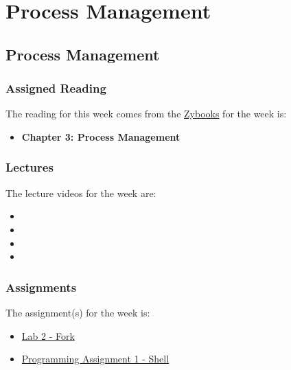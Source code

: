 \clearpage

\renewcommand{\ChapTitle}{Process Management}
\renewcommand{\SectionTitle}{Process Management}

\chapter{\ChapTitle}
\section{\SectionTitle}

\subsection{Assigned Reading}

The reading for this week comes from the \href{https://learn.zybooks.com/zybook/COLORADOCSPB3753KnoxFall2024}{Zybooks} for the week is:

\begin{itemize}
    \item \textbf{Chapter 3: Process Management}
\end{itemize}

\subsection{Lectures}

The lecture videos for the week are:

\begin{itemize}
    \item {}
    \item {}
    \item {}
    \item {}
\end{itemize}

\subsection{Assignments}

The assignment(s) for the week is:

\begin{itemize}
    \item \href{https://github.com/cu-cspb-3753-fall-2024/lab-2-QuantumCompiler}{Lab 2 - Fork}
    \item \href{https://github.com/cu-cspb-3753-fall-2024/pa-shell-QuantumCompiler}{Programming Assignment 1 - Shell}
\end{itemize}

